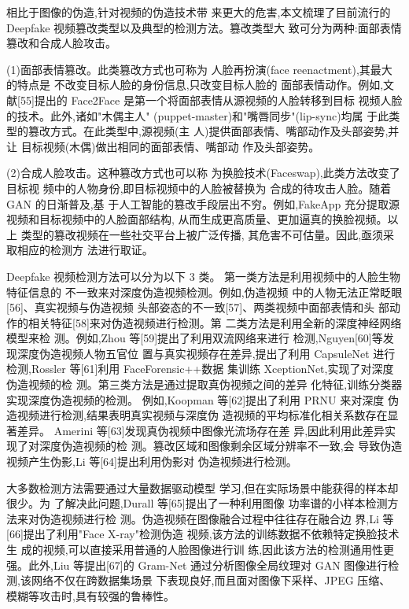 \documentclass{article}
\begin{document}
相比于图像的伪造,针对视频的伪造技术带 来更大的危害,本文梳理了目前流行的 Deepfake 视频篡改类型以及典型的检测方法。篡改类型大 致可分为两种:面部表情篡改和合成人脸攻击。

(1)面部表情篡改。此类篡改方式也可称为 人脸再扮演(face reenactment),其最大的特点是 不改变目标人脸的身份信息,只改变目标人脸的 面部表情动作。例如,文献[55]提出的 Face2Face 是第一个将面部表情从源视频的人脸转移到目标 视频人脸的技术。此外,诸如"木偶主人" (puppet-master)和"嘴唇同步"(lip-sync)均属 于此类型的篡改方式。在此类型中,源视频(主 人)提供面部表情、嘴部动作及头部姿势,并让 目标视频(木偶)做出相同的面部表情、嘴部动 作及头部姿势。

(2)合成人脸攻击。这种篡改方式也可以称 为换脸技术(Faceswap),此类方法改变了目标视 频中的人物身份,即目标视频中的人脸被替换为 合成的待攻击人脸。随着 GAN 的日渐普及,基 于人工智能的篡改手段层出不穷。例如,FakeApp 充分提取源视频和目标视频中的人脸面部结构, 从而生成更高质量、更加逼真的换脸视频。以上 类型的篡改视频在一些社交平台上被广泛传播, 其危害不可估量。因此,亟须采取相应的检测方 法进行取证。

Deepfake 视频检测方法可以分为以下 3 类。 第一类方法是利用视频中的人脸生物特征信息的 不一致来对深度伪造视频检测。例如,伪造视频 中的人物无法正常眨眼[56]、真实视频与伪造视频 头部姿态的不一致[57]、两类视频中面部表情和头 部动作的相关特征[58]来对伪造视频进行检测。第 二类方法是利用全新的深度神经网络模型来检 测。例如,Zhou 等[59]提出了利用双流网络来进行 检测,Nguyen[60]等发现深度伪造视频人物五官位 置与真实视频存在差异,提出了利用 CapsuleNet 进行检测,Rossler 等[61]利用 FaceForensic++数据 集训练 XceptionNet,实现了对深度伪造视频的检 测。第三类方法是通过提取真伪视频之间的差异 化特征,训练分类器实现深度伪造视频的检测。 例如,Koopman 等[62]提出了利用 PRNU 来对深度 伪造视频进行检测,结果表明真实视频与深度伪 造视频的平均标准化相关系数存在显著差异。 Amerini 等[63]发现真伪视频中图像光流场存在差 异,因此利用此差异实现了对深度伪造视频的检 测。篡改区域和图像剩余区域分辨率不一致,会 导致伪造视频产生伪影,Li 等[64]提出利用伪影对 伪造视频进行检测。

大多数检测方法需要通过大量数据驱动模型 学习,但在实际场景中能获得的样本却很少。为 了解决此问题,Durall 等[65]提出了一种利用图像 功率谱的小样本检测方法来对伪造视频进行检 测。伪造视频在图像融合过程中往往存在融合边 界,Li 等[66]提出了利用"Face X-ray"检测伪造 视频,该方法的训练数据不依赖特定换脸技术生 成的视频,可以直接采用普通的人脸图像进行训 练,因此该方法的检测通用性更强。此外,Liu 等提出[67]的 Gram-Net 通过分析图像全局纹理对 GAN 图像进行检测,该网络不仅在跨数据集场景 下表现良好,而且面对图像下采样、JPEG 压缩、 模糊等攻击时,具有较强的鲁棒性。
\end{document}
